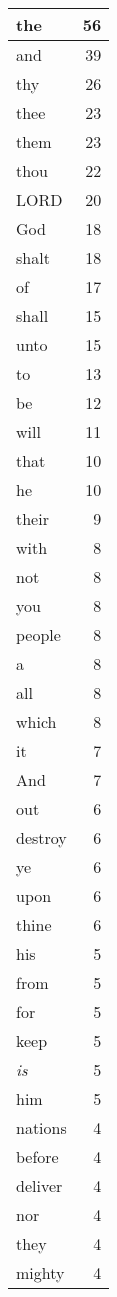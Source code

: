 \begin{center}
\begin{longtable}{l|r}
\hline \hline
\endlastfoot
the & 56 \\ \hline
and & 39 \\ \hline
thy & 26 \\ \hline
thee & 23 \\ \hline
them & 23 \\ \hline
thou & 22 \\ \hline
LORD & 20 \\ \hline
God & 18 \\ \hline
shalt & 18 \\ \hline
of & 17 \\ \hline
shall & 15 \\ \hline
unto & 15 \\ \hline
to & 13 \\ \hline
be & 12 \\ \hline
will & 11 \\ \hline
that & 10 \\ \hline
he & 10 \\ \hline
their & 9 \\ \hline
with & 8 \\ \hline
not & 8 \\ \hline
you & 8 \\ \hline
people & 8 \\ \hline
a & 8 \\ \hline
all & 8 \\ \hline
which & 8 \\ \hline
it & 7 \\ \hline
And & 7 \\ \hline
out & 6 \\ \hline
destroy & 6 \\ \hline
ye & 6 \\ \hline
upon & 6 \\ \hline
thine & 6 \\ \hline
his & 5 \\ \hline
from & 5 \\ \hline
for & 5 \\ \hline
keep & 5 \\ \hline
\emph{is} & 5 \\ \hline
him & 5 \\ \hline
nations & 4 \\ \hline
before & 4 \\ \hline
deliver & 4 \\ \hline
nor & 4 \\ \hline
they & 4 \\ \hline
mighty & 4 \\ \hline

\end{longtable}
\end{center}
